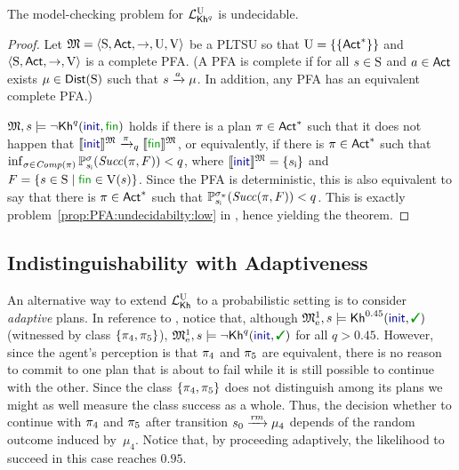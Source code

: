 \begin{theorem}\label{th:mc:PKhunc:undecidable}
  The model-checking problem for $\PKhunc$ is undecidable.
\end{theorem}
%
\begin{proof}
  Let $\model=\tup{\S,\Act,\ra,\Unc,\V}$ be a PLTSU so that
  $\Unc=\{\{\Act^*\}\}$ and $\tup{\S,\Act,\ra,\V}$ is a complete PFA.
  (A PFA is complete if for all $s\in\S$ and $a\in\Act$ exists
  $\mu\in\Dist(\S)$ such that $s\reach{a}\mu$. In addition, any PFA
  has an equivalent complete PFA.)

  $\model,s\models\neg\kh^q(\init,\fin)$ holds if there is a plan
  ${\plan\in \Act^*}$ such that it does not happen that
  ${\truthset{\model}{\init}\reach{\plan}_q\truthset{\model}{\fin}}$,
  or equivalently, if there is $\plan\in \Act^*$  such that
  $\inf_{\strat\in\Comp(\plan)}\Prob^\strat_{\sini}(\Succ(\plan,F)) < q$,
  where $\truthset{\model}{\init}=\{\sini\}$ and
  $F=\{{s\in\S}\mid{\fin\in\V(s)}\}$.
  Since the PFA is deterministic, this is also equivalent to say that
  there is $\plan\in \Act^*$ such that
  $\Prob^{\strat_\plan}_{\sini}(\Succ(\plan,F)) < q$.
  This is exactly problem~\ref{prop:PFA:undecidabilty:low} in
  , hence yielding the theorem.
\end{proof}
  


\subsection{Indistinguishability with Adaptiveness}\label{subsec:prob:indist:adaptive}

An alternative way to extend $\Khunc$ to a probabilistic setting is to
consider \emph{adaptive} plans.
%
In reference to , notice that, although
$\modelex^1,s \models \kh^{0.45}(\init,\goal)$ (witnessed by class
$\{\plan_4,\plan_5\}$), $\modelex^1,s \models \neg\kh^q(\init,\goal)$
for all $q>0.45$.
%
However, since the agent's perception is that $\plan_4$ and $\plan_5$
are equivalent, there is no reason to commit to one plan that is about
to fail while it is still possible to continue with the other.  Since
the class $\{\plan_4,\plan_5\}$ does not distinguish among its plans
we might as well measure the class success as a whole.
%
Thus, the decision whether to continue with $\plan_4$ and $\plan_5$
after transition $s_0\reach{\ramp}\mu_4$ depends of the random outcome
induced by~$\mu_4$.  Notice that, by proceeding adaptively, the
likelihood to succeed in this case reaches $0.95$.

